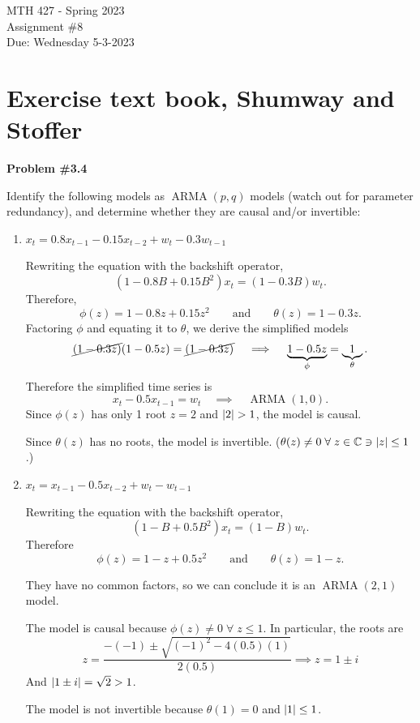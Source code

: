 \documentclass[12pt]{article}
\newcommand{\C}{\mathbb{C}}
\def\ARMA{\operatorname{ARMA}}
\newcommand{\nl}{\vspace{0.1in}\noindent}
\begin{document}
\pagestyle{fancy}
\fancyhf{}

\noindent MTH 427 - Spring 2023
\\Assignment \#8
\\Due: Wednesday 5-3-2023


\section{Exercise text book, Shumway and Stoffer}
\textbf{Problem \#3.4}

\noindent Identify the following models as $\ARMA(p, q)$ models (watch out for parameter redundancy), and determine whether they are causal and/or invertible:
\begin{enumerate}[label=(\alph*)]
    \item $x_t = 0.8 x_{t-1} - 0.15 x_{t-2} + w_t - 0.3w_{t-1}$
   
   \soln 
    
    \noindent Rewriting the equation with the backshift operator,
    $$(1-0.8B + 0.15 B^2)x_t = (1-0.3B)w_t.$$
    Therefore, 
    $$\phi(z) = 1 - 0.8z + 0.15z^2 \qquad \text{and} \qquad \theta(z) = 1 - 0.3z.$$
    Factoring $\phi$ and equating it to $\theta$, we derive the simplified models
    $$\cancel{(1-0.3z)}(1-0.5z) = \cancel{(1-0.3z)} \quad \implies \quad \underbrace{1-0.5z}_{\phi} = \underbrace{1}_{\theta}.$$
    Therefore the simplified time series is 
    $$x_t - 0.5x_{t-1} = w_t \quad \implies \quad \ARMA(1,0).$$
    Since $\phi(z)$ has only 1 root $z=2$ and $\abs{2} > 1$, the model is causal.

    \nl Since $\theta(z)$ has no roots, the model is invertible. ($\theta(z) \neq 0 \; \forall \; z \in \C \ni \abs{z} \leq 1$.)
\vspace{0.3in}
    \item $x_t = x_{t-1} - 0.5 x_{t-2} + w_t - w_{t-1}$ 
    
    \soln 
    
    \noindent Rewriting the equation with the backshift operator,
    $$(1-B + 0.5 B^2)x_t = (1-B)w_t.$$
    Therefore $$\phi(z) = 1-z+0.5z^2  \qquad \text{and} \qquad \theta(z) = 1 -z.$$

    \nl They have no common factors, so we can conclude it is an $\ARMA(2,1)$ model.

    \nl The model is causal because $\phi(z) \neq 0 \; \forall\; z \leq 1$. In particular, the roots are 
    $$z = \frac{-(-1) \pm \sqrt{(-1)^2 - 4(0.5)(1)}}{2(0.5)} \implies z = 1 \pm i$$
    And $\abs{1 \pm i} = \sqrt 2 > 1$.

    \nl The model is not invertible because $\theta(1) = 0$ and $\abs{1} \leq 1$.
\end{enumerate}
\end{document}
